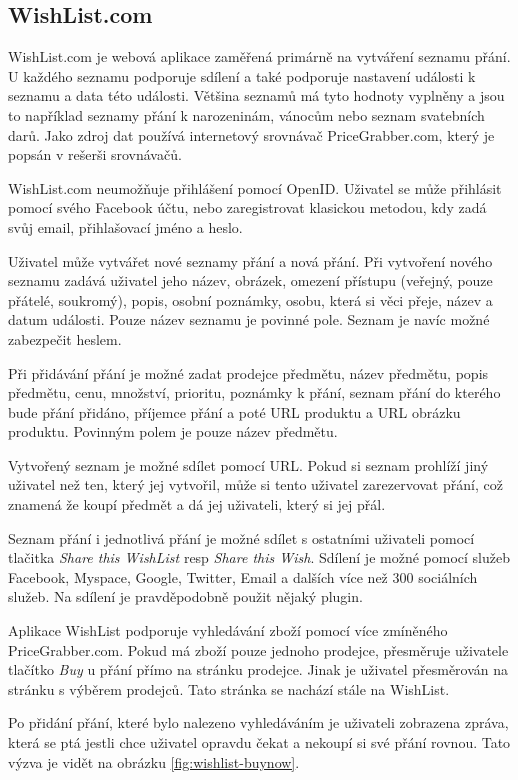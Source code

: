\subsection{WishList.com}
WishList.com je webová aplikace zaměřená primárně na vytváření seznamu přání. U každého seznamu podporuje sdílení a také podporuje nastavení události k seznamu a data této události. Většina seznamů má tyto hodnoty vyplněny a jsou to například seznamy přání k narozeninám, vánocům nebo seznam svatebních darů. Jako zdroj dat používá internetový srovnávač PriceGrabber.com, který je popsán v rešerši srovnávačů.

WishList.com neumožňuje přihlášení pomocí OpenID. Uživatel se může přihlásit pomocí svého Facebook účtu, nebo zaregistrovat klasickou metodou, kdy zadá svůj email, přihlašovací jméno a heslo.

Uživatel může vytvářet nové seznamy přání a nová přání. Při vytvoření nového seznamu zadává uživatel jeho název, obrázek, omezení přístupu (veřejný, pouze přátelé, soukromý), popis, osobní poznámky, osobu, která si věci přeje, název a datum události. Pouze název seznamu je povinné pole. Seznam je navíc možné zabezpečit heslem.

Při přidávání přání je možné zadat prodejce předmětu, název předmětu, popis předmětu, cenu, množství, prioritu, poznámky k přání, seznam přání do kterého bude přání přidáno, příjemce přání a poté URL produktu a URL obrázku produktu. Povinným polem je pouze název předmětu.

Vytvořený seznam je možné sdílet pomocí URL. Pokud si seznam prohlíží jiný uživatel než ten, který jej vytvořil, může si tento uživatel zarezervovat přání, což znamená že koupí předmět a dá jej uživateli, který si jej přál.

Seznam přání i jednotlivá přání je možné sdílet s ostatními uživateli pomocí tlačitka \emph{Share this WishList} resp \emph{Share this Wish}. Sdílení je možné pomocí služeb Facebook, Myspace, Google, Twitter, Email a dalších více než 300 sociálních služeb. Na sdílení je pravděpodobně použit nějaký plugin.

Aplikace WishList podporuje vyhledávání zboží pomocí více zmíněného PriceGrabber.com. Pokud má zboží pouze jednoho prodejce, přesměruje uživatele tlačítko \emph{Buy} u přání přímo na stránku prodejce. Jinak je uživatel přesměrován na stránku s výběrem prodejců. Tato stránka se nachází stále na WishList.

Po přidání přání, které bylo nalezeno vyhledáváním je uživateli zobrazena zpráva, která se ptá jestli chce uživatel opravdu čekat a nekoupí si své přání rovnou. Tato výzva je vidět na obrázku \ref{fig:wishlist-buynow}.

